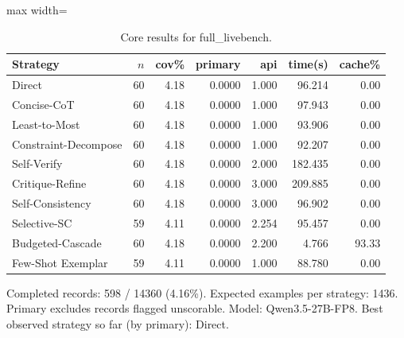 \documentclass[10pt,twocolumn]{article}
\begin{document}
\begin{table}[t]
\centering
\caption{Core results for full\_livebench.}
\label{tab:full_livebench_core}
\begin{adjustbox}{max width=\textwidth}
\begin{tabular}{lrrrrrr}
\toprule
Strategy & $n$ & cov\% & primary & api & time(s) & cache\% \\
\midrule
Direct & 60 & 4.18 & 0.0000 & 1.000 & 96.214 & 0.00 \\
Concise-CoT & 60 & 4.18 & 0.0000 & 1.000 & 97.943 & 0.00 \\
Least-to-Most & 60 & 4.18 & 0.0000 & 1.000 & 93.906 & 0.00 \\
Constraint-Decompose & 60 & 4.18 & 0.0000 & 1.000 & 92.207 & 0.00 \\
Self-Verify & 60 & 4.18 & 0.0000 & 2.000 & 182.435 & 0.00 \\
Critique-Refine & 60 & 4.18 & 0.0000 & 3.000 & 209.885 & 0.00 \\
Self-Consistency & 60 & 4.18 & 0.0000 & 3.000 & 96.902 & 0.00 \\
Selective-SC & 59 & 4.11 & 0.0000 & 2.254 & 95.457 & 0.00 \\
Budgeted-Cascade & 60 & 4.18 & 0.0000 & 2.200 & 4.766 & 93.33 \\
Few-Shot Exemplar & 59 & 4.11 & 0.0000 & 1.000 & 88.780 & 0.00 \\
\bottomrule
\end{tabular}
\end{adjustbox}
\vspace{2pt}\parbox{0.98\textwidth}{\footnotesize Completed records: 598 / 14360 (4.16\%). Expected examples per strategy: 1436. Primary excludes records flagged unscorable. Model: Qwen3.5-27B-FP8. Best observed strategy so far (by primary): Direct.}
\end{table}
\end{document}

